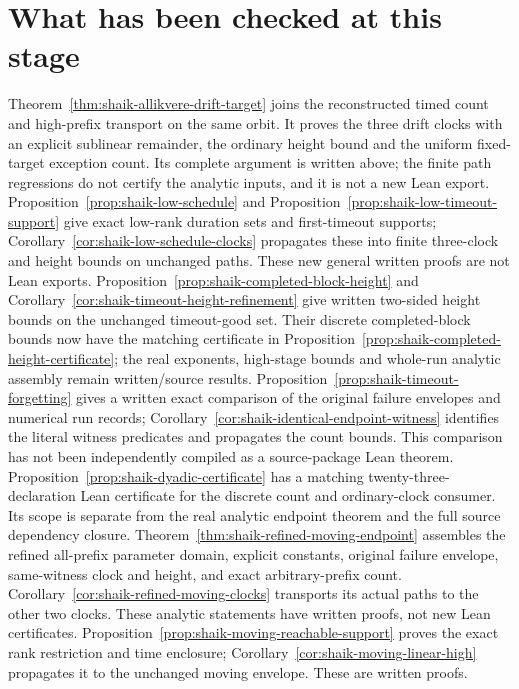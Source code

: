 \documentclass[11pt]{article}
\theoremstyle{remark}\newtheorem{remark}[proposition]{Remark}
\begin{document}
\section{What has been checked at this stage}
Theorem~\ref{thm:shaik-allikvere-drift-target} joins the reconstructed
timed count and high-prefix transport on the same orbit. It proves
the three drift clocks with an explicit sublinear remainder, the
ordinary height bound and the uniform fixed-target exception count.
Its complete argument is written above; the finite path regressions
do not certify the analytic inputs, and it is not a new Lean export.
Proposition~\ref{prop:shaik-low-schedule} and
Proposition~\ref{prop:shaik-low-timeout-support} give exact low-rank
duration sets and first-timeout supports; Corollary~\ref{cor:shaik-low-schedule-clocks}
propagates these into finite three-clock and height bounds on unchanged paths.
These new general written proofs are not Lean exports.
Proposition~\ref{prop:shaik-completed-block-height} and
Corollary~\ref{cor:shaik-timeout-height-refinement} give written two-sided
height bounds on the unchanged timeout-good set. Their discrete completed-block
bounds now have the matching certificate in
Proposition~\ref{prop:shaik-completed-height-certificate}; the real exponents,
high-stage bounds and whole-run analytic assembly remain written/source results.
Proposition~\ref{prop:shaik-timeout-forgetting} gives a written exact
comparison of the original failure envelopes and numerical run records;
Corollary~\ref{cor:shaik-identical-endpoint-witness} identifies the literal
witness predicates and propagates the count bounds. This comparison has
not been independently compiled as a source-package Lean theorem.
Proposition~\ref{prop:shaik-dyadic-certificate} has a matching
twenty-three-declaration Lean certificate for the discrete count and
ordinary-clock consumer. Its scope is separate from the real analytic
endpoint theorem and the full source dependency closure.
Theorem~\ref{thm:shaik-refined-moving-endpoint} assembles the refined
all-prefix parameter domain, explicit constants, original failure envelope,
same-witness clock and height, and exact arbitrary-prefix count.
Corollary~\ref{cor:shaik-refined-moving-clocks} transports its actual paths
to the other two clocks. These analytic statements have written proofs,
not new Lean certificates.
Proposition~\ref{prop:shaik-moving-reachable-support} proves the exact
rank restriction and time enclosure; Corollary~\ref{cor:shaik-moving-linear-high}
propagates it to the unchanged moving envelope. These are written proofs.
\end{document}

